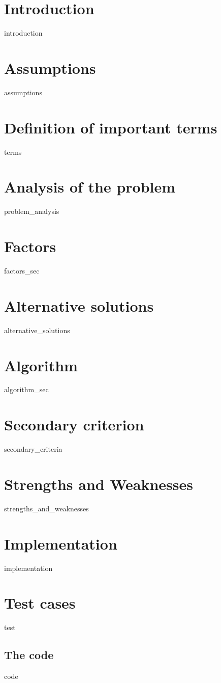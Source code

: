 \section{Introduction}
{introduction}

\section{Assumptions}
{assumptions}

\section{Definition of important terms}
\begin{labeling}{\hspace{3cm}}
{terms}
\end{labeling}

\section{Analysis of the problem}
{problem_analysis}

\section{Factors}
{factors_sec}

\section{Alternative solutions}
{alternative_solutions}

\section{Algorithm}
{algorithm_sec}

\section{Secondary criterion}
{secondary_criteria}

\section{Strengths and Weaknesses}
{strengths_and_weaknesses}

\section{Implementation}
{implementation}

\section{Test cases}
{test}

\clearpage
\printbibliography[heading=bibintoc]

\clearpage
\begin{appendices}

\section{The code} \label{appendix:code}
{code}

\end{appendices}

